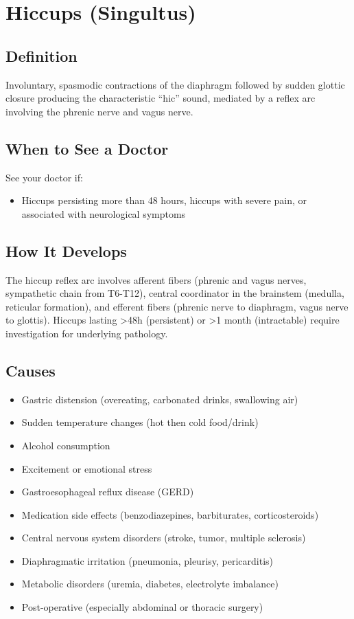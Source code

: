 \chapter{Hiccups (Singultus)}

\section*{Definition}
Involuntary, spasmodic contractions of the diaphragm followed by sudden glottic closure producing the characteristic ``hic'' sound, mediated by a reflex arc involving the phrenic nerve and vagus nerve.

\section*{When to See a Doctor}
See your doctor if:
\begin{itemize}
  \item Hiccups persisting more than 48 hours, hiccups with severe pain, or associated with neurological symptoms
\end{itemize}

\section*{How It Develops}
The hiccup reflex arc involves afferent fibers (phrenic and vagus nerves, sympathetic chain from T6-T12), central coordinator in the brainstem (medulla, reticular formation), and efferent fibers (phrenic nerve to diaphragm, vagus nerve to glottis). Hiccups lasting >48h (persistent) or >1 month (intractable) require investigation for underlying pathology.

\section*{Causes}
\begin{itemize}
  \item Gastric distension (overeating, carbonated drinks, swallowing air)
  \item Sudden temperature changes (hot then cold food/drink)
  \item Alcohol consumption
  \item Excitement or emotional stress
  \item Gastroesophageal reflux disease (GERD)
  \item Medication side effects (benzodiazepines, barbiturates, corticosteroids)
  \item Central nervous system disorders (stroke, tumor, multiple sclerosis)
  \item Diaphragmatic irritation (pneumonia, pleurisy, pericarditis)
  \item Metabolic disorders (uremia, diabetes, electrolyte imbalance)
  \item Post-operative (especially abdominal or thoracic surgery)
\end{itemize}

